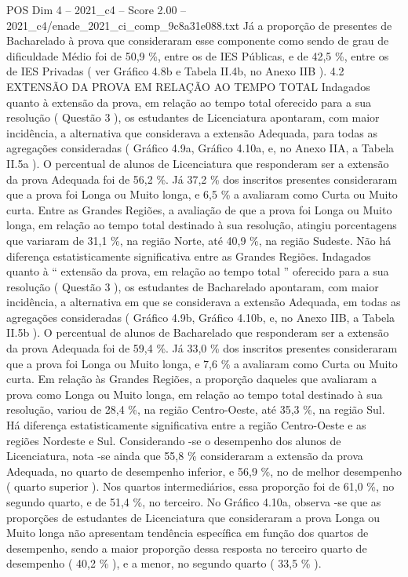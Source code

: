 \begin{textsample}{POS Dim 4 – 2021\_c4 – Score 2.00 – 2021\_c4/enade\_2021\_ci\_comp\_9c8a31e088.txt}
Já a proporção de presentes de Bacharelado à prova que consideraram esse componente como sendo de grau de dificuldade Médio foi de 50,9 \%, entre os de IES Públicas, e de 42,5 \%, entre os de IES Privadas ( ver Gráfico 4.8b e Tabela II.4b, no Anexo IIB ). 4.2 EXTENSÃO DA PROVA EM RELAÇÃO AO TEMPO TOTAL Indagados quanto à extensão da prova, em relação ao tempo total oferecido para a sua resolução ( Questão 3 ), os estudantes de Licenciatura apontaram, com maior incidência, a alternativa que considerava a extensão Adequada, para todas as agregações consideradas ( Gráfico 4.9a, Gráfico 4.10a, e, no Anexo IIA, a Tabela II.5a ).
O percentual de alunos de Licenciatura que responderam ser a extensão da prova Adequada foi de 56,2 \%.
Já 37,2 \% dos inscritos presentes consideraram que a prova foi Longa ou Muito longa, e 6,5 \% a avaliaram como Curta ou Muito curta.
Entre as Grandes Regiões, a avaliação de que a prova foi Longa ou Muito longa, em relação ao tempo total destinado à sua resolução, atingiu porcentagens que variaram de 31,1 \%, na região Norte, até 40,9 \%, na região Sudeste.
Não há diferença estatisticamente significativa entre as Grandes Regiões.
Indagados quanto à “ extensão da prova, em relação ao tempo total ” oferecido para a sua resolução ( Questão 3 ), os estudantes de Bacharelado apontaram, com maior incidência, a alternativa em que se considerava a extensão Adequada, em todas as agregações consideradas ( Gráfico 4.9b, Gráfico 4.10b, e, no Anexo IIB, a Tabela II.5b ).
O percentual de alunos de Bacharelado que responderam ser a extensão da prova Adequada foi de 59,4 \%.
Já 33,0 \% dos inscritos presentes consideraram que a prova foi Longa ou Muito longa, e 7,6 \% a avaliaram como Curta ou Muito curta.
Em relação às Grandes Regiões, a proporção daqueles que avaliaram a prova como Longa ou Muito longa, em relação ao tempo total destinado à sua resolução, variou de 28,4 \%, na região Centro-Oeste, até 35,3 \%, na região Sul.
Há diferença estatisticamente significativa entre a região Centro-Oeste e as regiões Nordeste e Sul.
Considerando -se o desempenho dos alunos de Licenciatura, nota -se ainda que 55,8 \% consideraram a extensão da prova Adequada, no quarto de desempenho inferior, e 56,9 \%, no de melhor desempenho ( quarto superior ).
Nos quartos intermediários, essa proporção foi de 61,0 \%, no segundo quarto, e de 51,4 \%, no terceiro.
No Gráfico 4.10a, observa -se que as proporções de estudantes de Licenciatura que consideraram a prova Longa ou Muito longa não apresentam tendência específica em função dos quartos de desempenho, sendo a maior proporção dessa resposta no terceiro quarto de desempenho ( 40,2 \% ), e a menor, no segundo quarto ( 33,5 \% ).

\end{textsample}

